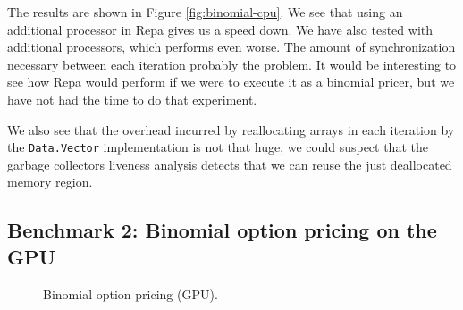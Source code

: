 The results are shown in Figure \ref{fig:binomial-cpu}. We see that
using an additional processor in Repa gives us a speed down. We have
also tested with additional processors, which performs even worse. The
amount of synchronization necessary between each iteration probably
the problem. It would be interesting to see how Repa would perform if
we were to execute it as a binomial pricer, but we have not had the
time to do that experiment.

We also see that the overhead incurred by reallocating arrays in each
iteration by the \lstinline{Data.Vector} implementation is not that huge,
we could suspect that the garbage collectors liveness analysis detects
that we can reuse the just deallocated memory region.


\subsection{Benchmark 2: Binomial option pricing on the GPU}
\begin{figure}
	\centering
\begin{adjustbox}{minipage=1.3\textwidth,margin=0pt \smallskipamount,center}
\end{adjustbox}
  \caption{Binomial option pricing (GPU).}
\label{fig:binomial-gpu}
\end{figure}

